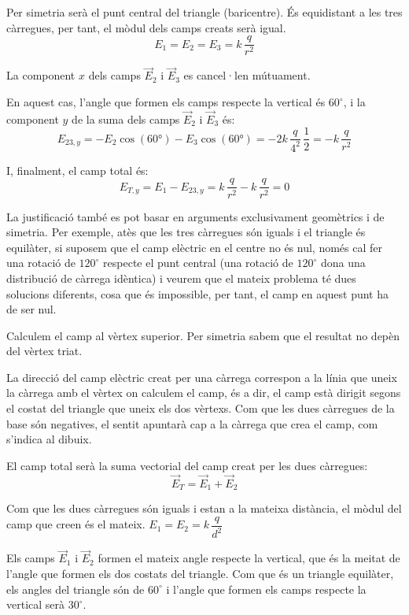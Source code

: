 \begin{solapartat}

 Per simetria serà el punt central del triangle (baricentre). És equidistant
a les tres càrregues, per tant, el mòdul dels camps creats serà igual.
\[ E_1 = E_2 = E_3 = k\,\frac{q}{r^2} \]

La component $x$ dels camps $\vec{E}_2$ i $\vec{E}_3$ es cancel·len mútuament.

En aquest cas, l'angle que formen els camps respecte la vertical és $60^\circ$, i la
component $y$ de la suma dels camps $\vec{E}_2$ i $\vec{E}_3$ és:
\[ E_{23,y} = -E_2\cos(60°) - E_3\cos(60°) = -2k\,\frac{q}{4^2}\,\frac{1}{2} = -k\,\frac{q}{r^2} \]

I, finalment, el camp total és:
\[ E_{T,y} = E_1 - E_{23,y} = k\,\frac{q}{r^2} - k\,\frac{q}{r^2} = 0 \]

La justificació també es pot basar en arguments exclusivament geomètrics i de simetria.
Per exemple, atès que les tres càrregues són iguals i el triangle és equilàter, si
suposem que el camp elèctric en el centre no és nul, només cal fer una rotació de
$120^\circ$ respecte el punt central (una rotació de $120^\circ$ dona una distribució de
càrrega idèntica) i veurem que el mateix problema té dues solucions diferents, cosa que
és impossible, per tant, el camp en aquest punt ha de ser nul.


 Calculem el camp al vèrtex superior. Per simetria sabem que el resultat no
depèn del vèrtex triat.

La direcció del camp elèctric creat per una càrrega correspon a la línia que uneix la
càrrega amb el vèrtex on calculem el camp, és a dir, el camp està dirigit segons el
costat del triangle que uneix els dos vèrtexs. Com que les dues càrregues de la base són
negatives, el sentit apuntarà cap a la càrrega que crea el camp, com s'indica al dibuix.

 El camp total serà la suma vectorial del camp creat per les dues càrregues:
\[ \vec{E}_T = \vec{E}_1 + \vec{E}_2 \]

 Com que les dues càrregues són iguals i estan a la mateixa distància, el
mòdul del camp que creen és el mateix. $E_1 = E_2 = k\,\dfrac{q}{d^2}$

 Els camps $\vec{E}_1$ i $\vec{E}_2$ formen el mateix angle respecte la
vertical, que és la meitat de l'angle que formen els dos costats del triangle. Com que és
un triangle equilàter, els angles del triangle són de $60^\circ$ i l'angle que formen els
camps respecte la vertical serà $30^\circ$.


\end{solapartat}
